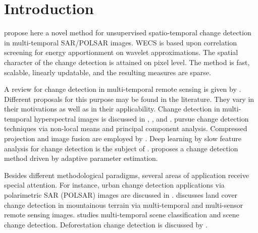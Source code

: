 \documentclass[journal]{IEEEtran}
\begin{document}
%
\IEEEpeerreviewmaketitle



\section{Introduction}
% 
% 
% 
% 
 propose here a novel method for unsupervised spatio-temporal change detection in multi-temporal SAR/POLSAR images. WECS is based upon correlation screening for energy apportionment on wavelet approximations. The spatial character of the change detection is attained on pixel level. The method is fast, scalable, linearly updatable, and the resulting measures are sparse. 

A review for change detection in multi-temporal remote sensing is given by \cite{ban2016change}. 
Different proposals for this purpose may be found  in the literature. They vary in their motivations as well as in their applicability.  Change detection in multi-temporal hyperspectral images is discussed in \cite{bovolo2015time},  \cite{liu2019review}, and \cite{matsunaga2017current}.  \cite{jia2018novel} pursue change detection techniques via non-local means and principal component analysis. Compressed projection and image fusion are employed by \cite{hou2014unsupervised}. Deep learning by slow feature analysis for change detection is the subject of \cite{du2019unsupervised}. \cite{chen2020change} proposes a change detection method driven by adaptive parameter estimation.

Besides different methodological paradigms, several areas of application receive special attention.  For instance, urban change detection applications via polarimetric SAR (POLSAR) images are discussed in \cite{ansari2020urban}. \cite{song2018multi} discusses land cover change detection in mountainous terrain via multi-temporal and multi-sensor remote sensing images. \cite{ru2021multi} studies multi-temporal scene classification and scene change detection. Deforestation change detection is discussed by \cite{barreto2016deforestation}. 
\end{document}
